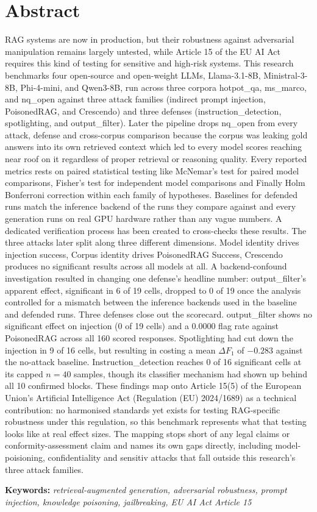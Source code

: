 \chapter*{Abstract}

RAG systems are now in production, but their robustness against adversarial manipulation remains largely untested, while Article 15 of the EU AI Act requires this kind of testing for sensitive and high-risk systems. This research benchmarks four open-source and open-weight LLMs, Llama-3.1-8B, Ministral-3-8B, Phi-4-mini, and Qwen3-8B, run across three corpora
hotpot\_qa, ms\_marco, and nq\_open against three attack families (indirect prompt injection, PoisonedRAG, and Crescendo) and three defenses (instruction\_detection, spotlighting, and output\_filter). Later the pipeline drops nq\_open from every attack, defense and cross-corpus comparison because the corpus was leaking gold answers into its own retrieved context which led to every model scores reaching near roof on it regardless of proper retrieval or reasoning quality.
Every reported metrics rests on paired statistical testing like McNemar's test for paired model comparisons, Fisher's test for independent model comparisons and Finally Holm Bonferroni correction within each family of hypotheses.
Baselines for defended runs match the inference backend of the runs they  compare against and every generation runs on real GPU hardware rather than any vague numbers. A dedicated verification process has been created to cross-checks these results.
The three attacks later split along three different dimensions. Model identity drives injection success, Corpus identity drives PoisonedRAG Success, Crescendo produces no significant results across all models at all.
A backend-confound investigation resulted in changing one defense's headline number: output\_filter's apparent effect, significant in 6 of 19 cells, dropped to 0 of 19 once the analysis controlled for a mismatch between the inference backends used in the baseline and defended runs.
Three defenses close out the scorecard. output\_filter shows no significant effect on injection (0 of 19 cells) and a 0.0000 flag rate against PoisonedRAG across all 160 scored responses.
Spotlighting had cut down the injection in 9 of 16 cells, but resulting in costing a mean $\Delta F_1$ of $-0.283$ against the no-attack baseline. 
Instruction\_detection reaches 0 of 16 significant cells at its capped $n=40$ samples, though its classifier mechanism had shown up behind all 10 confirmed blocks.
These findings map onto Article 15(5) of the European Union's Artificial Intelligence Act (Regulation (EU) 2024/1689) as a technical contribution: no harmonised standards yet exists for testing RAG-specific robustness under this regulation, so this benchmark represents what that testing looks like at real effect sizes.
The mapping stops short of any legal claims or conformity-assessment claim and names its own gaps directly, including model-poisioning, confidentiality and sensitiv attacks that fall outside this research's three attack families.

\vspace{1em}
\noindent\textbf{Keywords:} \textit{retrieval-augmented generation, adversarial robustness, prompt injection, knowledge poisoning, jailbreaking, EU AI Act Article 15}
